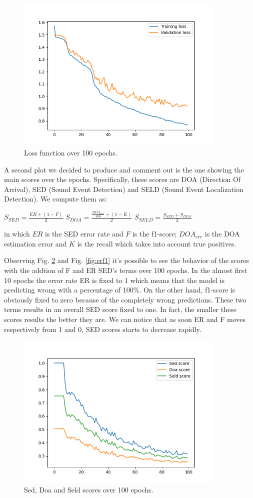 \documentclass[11pt]{article}
\begin{document}
\begin{figure}[h!]
	\centering
	\includegraphics[width=10cm]{img/loss.png}
	\caption{Loss function over 100 epochs.}
	\label{fig:loss}
\end{figure}

\noindent
A second plot we decided to produce and comment out is the one showing the main scores over the epochs. Specifically, these scores are DOA (Direction Of Arrival), SED (Sound Event Detection) and SELD (Sound Event Localization Detection). We compute them as:

$S_{SED} = \frac{ER + (1-F)}{2}$ \space\space
$S_{DOA} = \frac{\frac{DOA_{err}}{180} + (1-K)}{2}$ \space\space
$S_{SELD} = \frac{S_{SED} + S_{DOA}}{2}$ \space\space

\noindent
in which $ER$ is the SED error rate and $F$ is the f1-score; $DOA_{err}$ is the DOA estimation error and $K$ is the recall which takes into account true positives.

Observing Fig. \ref{fig:scores} and Fig. \ref{fig:erf1} it's possible to see the behavior of the scores with the addtion of F and ER SED's terms over 100 epochs. In the almost first 10 epochs the error rate ER is fixed to 1 which means that the model is predicting wrong with a percentage of 100\%. On the other hand, f1-score is obviously fixed to zero because of the completely wrong predictions. These two terms results in an overall SED score fixed to one. In fact, the smaller these scores results the better they are. We can notice that as soon ER and F moves respectively from 1 and 0, SED scores starts to decrease rapidly.

\begin{figure}[h!]
	\centering
	\includegraphics[width=10cm]{img/scores.png}
	\caption{Sed, Doa and Seld scores over 100 epochs.}
	\label{fig:scores}
\end{figure}
\end{document}

